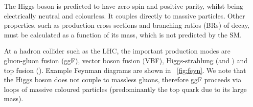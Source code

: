 
The Higgs boson is predicted to have zero spin and positive parity, whilst being 
electrically neutral and colourless. It couples directly to massive particles. Other 
properties, such as production cross sections and branching ratios (BRs) of decay, must be 
calculated as a function of its mass, which is not predicted by the SM.


At a hadron collider such as the LHC, the important production modes are gluon-gluon 
fusion (ggF), vector boson fusion (VBF), Higgs-strahlung (\WH and \ZH) and top fusion 
(\ttH). Example Feynman diagrams are shown in \Figure~\ref{fig:feyn}. We note that the 
Higgs boson does not couple to massless gluons, therefore ggF proceeds via loops of 
massive coloured particles (predominantly the top quark due to its large mass). 

